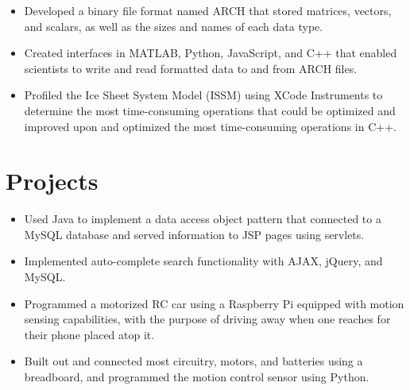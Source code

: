 \documentclass[letterpaper]{deedy-resume} %
\begin{document}
\begin{minipage}[t]{0.65\textwidth}
\begin{itemize}[leftmargin=.5cm]
\item Developed a binary file format named ARCH that stored matrices, vectors, and scalars, as well as the sizes and
names of each data type.
\item Created interfaces in MATLAB, Python, JavaScript, and C++ that enabled scientists to write and read formatted
data to and from ARCH files.
\item Profiled the Ice Sheet System Model (ISSM) using XCode Instruments to determine the most time-consuming operations that could be optimized and improved upon and optimized the most time-consuming operations in C++.
\end{itemize}



\section{Projects}



\begin{itemize}[leftmargin=.5cm]
\item Used Java to implement a data access object pattern that connected to a MySQL database and served
information to JSP pages using servlets.
\item Implemented auto-complete search functionality with AJAX, jQuery, and MySQL.

\end{itemize}



\begin{itemize}[leftmargin=.5cm]
\item 
Programmed a motorized RC car using a Raspberry Pi equipped with motion sensing capabilities, with the purpose of driving away when one reaches for their phone placed atop it.
\item
Built out and connected most circuitry, motors, and batteries using a breadboard, and programmed the motion control sensor using Python.
\end{itemize}




\end{minipage}
\end{document}
